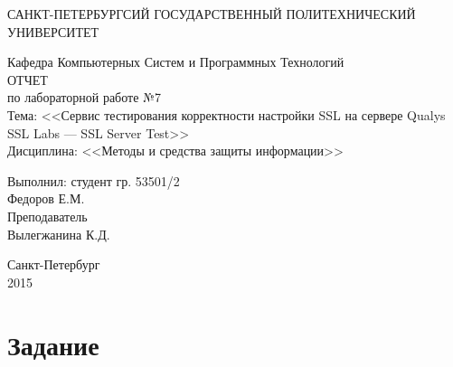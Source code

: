 \documentclass[utf8x, 12pt]{G7-32}
\begin{document}
\frontmatter 


\begin{center} 

\large САНКТ-ПЕТЕРБУРГСИЙ ГОСУДАРСТВЕННЫЙ ПОЛИТЕХНИЧЕСКИЙ УНИВЕРСИТЕТ

\large Кафедра Компьютерных Систем и Программных Технологий \\[5.5cm] 

\huge ОТЧЕТ \\[0.6cm] %
\large по лабораторной работе №7\\
\large Тема: <<Сервис тестирования корректности настройки SSL на сервере Qualys SSL Labs --- SSL Server Test>>\\
\large Дисциплина: <<Методы и средства защиты информации>>\\[3.7cm]

\end{center} 

\begin{flushright}
Выполнил: студент гр. 53501/2 \\
Федоров Е.М. \\[1.2cm]


Преподаватель \\
Вылегжанина К.Д.
\end{flushright}


\vfill 

\begin{center} 
\large Санкт-Петербург \\
2015
\end{center} 

\thispagestyle{empty}



\thispagestyle{empty}
\setcounter{page}{0}
\tableofcontents
\clearpage
\mainmatter


\chapter{Задание}
\end{document}
